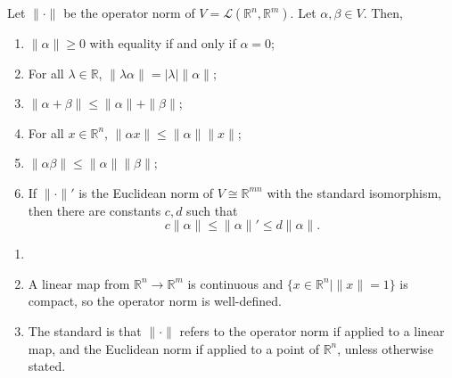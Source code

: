 \documentclass[12pt]{article}
\begin{document}
\begin{proposition}
	Let $\|\cdot\|$ be the operator norm of $V = \mathcal{L}(\mathbb{R}^{n}, \mathbb{R}^{m})$. Let $\alpha, \beta \in V$. Then,
	\begin{enumerate}[\normalfont(i)]
		\item $\|\alpha\| \geq 0$ with equality if and only if $\alpha = 0$;
		\item For all $\lambda \in \mathbb{R}$, $\|\lambda \alpha \| = |\lambda| \|\alpha\|$;
		\item $\|\alpha + \beta\| \leq \|\alpha\| + \|\beta\|$;
		\item For all $x \in \mathbb{R}^{n}$, $\|\alpha x\| \leq \|\alpha\| \|x\|$;
		\item $\|\alpha \beta \| \leq \|\alpha\|\|\beta\|$;
		\item If $\|\cdot\|'$ is the Euclidean norm of $V \cong \mathbb{R}^{mn}$ with the standard isomorphism, then there are constants $c, d$ such that
			\[
			c\|\alpha\| \leq \|\alpha\|' \leq d\|\alpha\|
			.\]
	\end{enumerate}
\end{proposition}

\begin{remark}
	\begin{enumerate}[1.]
		\item[]
		\item A linear map from $\mathbb{R}^{n} \to \mathbb{R}^{m}$ is continuous and $\{x \in \mathbb{R}^{n} \mid \|x\| = 1\}$ is compact, so the operator norm is well-defined.
		\item The standard is that $\|\cdot\|$ refers to the operator norm if applied to a linear map, and the Euclidean norm if applied to a point of $\mathbb{R}^{n}$, unless otherwise stated.
	\end{enumerate}	
\end{remark}
\end{document}
